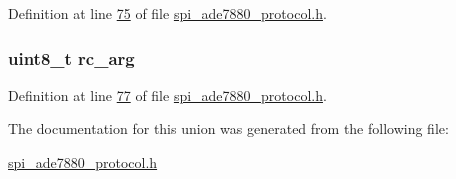 Definition at line \hyperlink{a00041_source_l00075}{75} of file \hyperlink{a00041_source}{spi\-\_\-ade7880\-\_\-protocol.\-h}.

\hypertarget{a00015_aa11432305021ed2018866e1f8e990c34}{
\subsubsection[{rc\-\_\-arg}]{\setlength{\rightskip}{0pt plus 5cm}uint8\-\_\-t rc\-\_\-arg}}\label{dd/d1b/a00015_aa11432305021ed2018866e1f8e990c34}


Definition at line \hyperlink{a00041_source_l00077}{77} of file \hyperlink{a00041_source}{spi\-\_\-ade7880\-\_\-protocol.\-h}.



The documentation for this union was generated from the following file\-:\begin{DoxyCompactItemize}
\item 
\hyperlink{a00041}{spi\-\_\-ade7880\-\_\-protocol.\-h}\end{DoxyCompactItemize}
